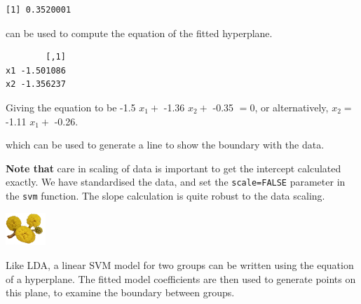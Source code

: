 \documentclass[
  letterpaper,
]{krantz}
\newenvironment{Shaded}{\begin{snugshade}}{\end{snugshade}}
\newcommand{\AttributeTok}[1]{\textcolor[rgb]{0.40,0.45,0.13}{#1}}
\newcommand{\DecValTok}[1]{\textcolor[rgb]{0.68,0.00,0.00}{#1}}
\newcommand{\FunctionTok}[1]{\textcolor[rgb]{0.28,0.35,0.67}{#1}}
\newcommand{\NormalTok}[1]{\textcolor[rgb]{0.00,0.23,0.31}{#1}}
\newcommand{\OtherTok}[1]{\textcolor[rgb]{0.00,0.23,0.31}{#1}}
\newcommand{\SpecialCharTok}[1]{\textcolor[rgb]{0.37,0.37,0.37}{#1}}
\newcommand{\infobox}[1]{%
\noindent\colorbox{info!30}{%
\begin{minipage}{0.98\linewidth}%
    \centering%
    \begin{minipage}[c]{0.15\linewidth} %
      \includegraphics[width=1.5cm]{images/mulga-flowers2.png} %
    \end{minipage}%
    \hfill %
    \begin{minipage}[c]{0.8\linewidth} %
      \bigskip%
      \textsf{#1}%
      \bigskip%
    \end{minipage}%
    \hspace*{3mm}%
  \end{minipage}%
}%
}
\begin{document}
\begin{Shaded}
\end{Shaded}

\begin{verbatim}
[1] 0.3520001
\end{verbatim}

can be used to compute the equation of the fitted hyperplane.

\begin{Shaded}
\end{Shaded}

\begin{verbatim}
        [,1]
x1 -1.501086
x2 -1.356237
\end{verbatim}

Giving the equation to be -1.5 \(x_1 +\) -1.36 \(x_2 +\) -0.35 \(=0\),
or alternatively, \(x_2 =\) -1.11 \(x_1 +\) -0.26.

which can be used to generate a line to show the boundary with the data.

\begin{Shaded}
\end{Shaded}

\textbf{Note that} care in scaling of data is important to get the
intercept calculated exactly. We have standardised the data, and set the
\texttt{scale=FALSE} parameter in the \texttt{svm} function. The slope
calculation is quite robust to the data scaling.

\infobox{Like LDA, a linear SVM model for two groups can be written using the equation of a hyperplane. The fitted model coefficients are then used to generate points on this plane, to examine the boundary between groups.
}
\end{document}
